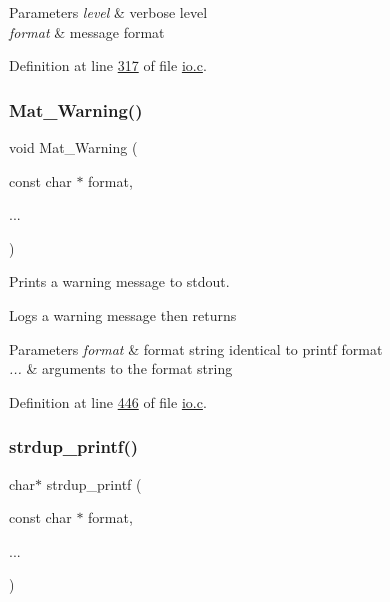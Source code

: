 \begin{DoxyParams}{Parameters}
{\em level} & verbose level \\
\hline
{\em format} & message format \\
\hline
\end{DoxyParams}


Definition at line \hyperlink{io_8c_source_l00317}{317} of file \hyperlink{io_8c_source}{io.\+c}.

\mbox{\label{group__mat__util_gafcedc83eb7e4759a8ea5c974c4f801c3}} 
\subsubsection{\texorpdfstring{Mat\+\_\+\+Warning()}{Mat\_Warning()}}
{\footnotesize\ttfamily void Mat\+\_\+\+Warning (\begin{DoxyParamCaption}\item[{const char $\ast$}]{format,  }\item[{}]{... }\end{DoxyParamCaption})}



Prints a warning message to stdout. 

Logs a warning message then returns


\begin{DoxyParams}{Parameters}
{\em format} & format string identical to printf format \\
\hline
{\em ...} & arguments to the format string \\
\hline
\end{DoxyParams}


Definition at line \hyperlink{io_8c_source_l00446}{446} of file \hyperlink{io_8c_source}{io.\+c}.

\mbox{\label{group__mat__util_ga291b08f933c75fb70e3736b669896ebd}} 
\subsubsection{\texorpdfstring{strdup\+\_\+printf()}{strdup\_printf()}}
{\footnotesize\ttfamily char$\ast$ strdup\+\_\+printf (\begin{DoxyParamCaption}\item[{const char $\ast$}]{format,  }\item[{}]{... }\end{DoxyParamCaption})}



